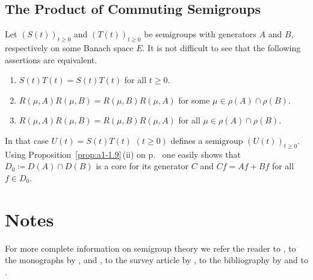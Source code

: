 \subsection{The Product of Commuting Semigroups}\label{subsec:a1-3.9}%
Let $(S(t))_{t\geq 0}$ and $(T(t))_{t\geq 0}$ be semigroups with generators $A$ and $B$, respectively on some Banach space $E$.
It is not difficult to see that the following assertions are equivalent.
\begin{enumerate}[\upshape (a)]

\item  
$S(t)T(t) = S(t)T(t)$ for all $t \geq 0$.

\item 
$R(\mu,A)R(\mu,B) = R(\mu,B)R(\mu,A)$ for some $\mu \in \rho(A) \cap \rho(B)$.

\item 
$R(\mu,A)R(\mu,B) = R(\mu,B)R(\mu,A)$ for all $\mu \in \rho(A) \cap \rho(B)$.

\end{enumerate}
In that case $U(t) = S(t)T(t)$ $(t \geq 0)$ defines a semigroup $(U(t))_{t\geq 0}$.
Using %
Proposition~\ref{prop:a1-1.9}\,(ii) on p.~\pageref{prop:a1-1.9} 
one easily shows that $D_{0} \coloneqq D(A) \cap D(B)$ is a core for its generator $C$ and $Cf = Af + Bf$ for all $f \in D_{0}$.

\section*{Notes}
%

For more complete information on semigroup theory we refer the reader to \citet{hillephillips:1957}, to the monographs by \citet{davies:1980}, 
\citet{goldstein:1985a} and \citet{pazy:1983}, to the survey article by \citet{kreinkhazan:1985}, to the bibliography by 
\citet{goldstein:1985b} and to \citet{engelnagel:2006}.


{\RaggedRight

}